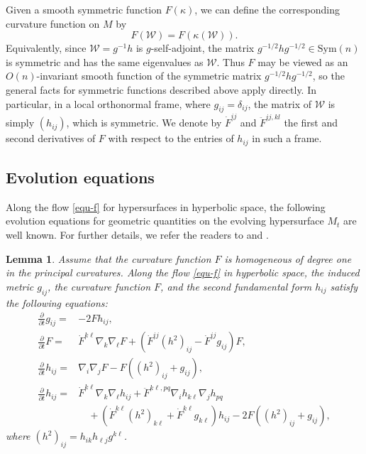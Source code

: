 \documentclass[11pt,reqno]{amsart}
\newtheorem{lemma}[proposition]{Lemma}
\theoremstyle{remark}
\numberwithin{equation}{section}
\begin{document}
Given a smooth symmetric  function \(F(\kappa)\), we can define the corresponding curvature function on \(M\) by
\[
F(\mathcal W)=F(\kappa(\mathcal W)).
\]
Equivalently, since \(\mathcal W=g^{-1}h\) is \(g\)-self-adjoint, the matrix \(g^{-1/2}hg^{-1/2}\in \mathrm{Sym}(n)\)
is symmetric and has the same eigenvalues as \(\mathcal W\). Thus \(F\) may be viewed as an \(O(n)\)-invariant smooth function of the symmetric matrix \(g^{-1/2}hg^{-1/2}\), so the general facts for symmetric functions described above apply directly. In particular, in a local orthonormal frame, where \(g_{ij}=\delta_{ij}\), the matrix of \(\mathcal W\) is simply \((h_{ij})\), which is symmetric. We denote by \(\dot F^{ij}\) and \(\ddot F^{ij,kl}\) the first and second derivatives of \(F\) with respect to the entries of \(h_{ij}\) in such a frame.

\subsection{Evolution equations}
Along the flow \eqref{equ-f} for hypersurfaces in hyperbolic space, the following evolution equations for geometric quantities on the evolving hypersurface $M_t$ are well known. For further details, we refer the readers to \cite{And9402,AC17,ACW21} and \cite{ge06}.
\begin{lemma}
Assume that the curvature function $F$ is homogeneous of degree one in the principal curvatures. 	Along the flow \eqref{equ-f} in hyperbolic space, the induced metric $g_{ij}$, the  curvature function $F$, and the second fundamental form $h_{ij}$ satisfy the following equations:
\begin{align}
    \frac{\partial}{\partial t}g_{ij}=&-2Fh_{ij},\label{s2.evl-g}\\
		\frac{\partial}{\partial t} F = & \dot{F}^{k\ell}\nabla_k\nabla_{\ell}F + \left( \dot{F}^{ij}(h^2)_{ij}- \dot{F}^{ij}g_{ij} \right)F,  \label{equ-psi}\\
        \frac{\partial}{\partial t}h_{ij}=&\nabla_i\nabla_jF-F\left((h^2)_{ij}+g_{ij}\right),\label{s2.evl-h1}\\
        \frac{\partial}{\partial t}h_{ij}=&\dot{F}^{k\ell}\nabla_k\nabla_{\ell}h_{ij} + \ddot{F}^{k\ell,pq}\nabla_i h_{k\ell} \nabla_j h_{pq} \nonumber\\
        &\quad + \left( \dot{F}^{k\ell}(h^2)_{k\ell} + \dot{F}^{k\ell}g_{k\ell}\right)h_{ij} - 2F\left((h^2)_{ij}+ g_{ij}\right),  \label{s2.evlh2}
		\end{align}
where $(h^2)_{ij}=h_{ik}h_{\ell j}g^{k\ell}$. 
\end{lemma}
\end{document}
